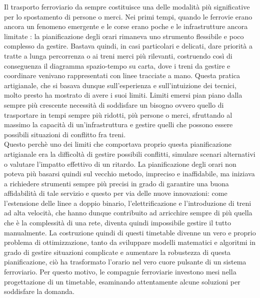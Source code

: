\documentclass[a4paper,12pt]{report}
\begin{document}
Il trasporto ferroviario da sempre costituisce una delle modalità più significative per lo spostamento di persone o merci. Nei primi tempi, quando le ferrovie erano ancora un fenomeno emergente e le corse erano poche e le infrastrutture ancora limitate : la pianificazione degli orari rimaneva uno strumento flessibile e poco complesso da gestire. Bastava quindi, in casi particolari e delicati, dare priorità a tratte a lunga percorrenza o ai treni merci più rilevanti, costruendo così di conseguenza il diagramma spazio-tempo su carta, dove i treni da gestire e coordinare venivano rappresentati con linee tracciate a mano. Questa pratica artigianale, che si basava dunque sull'esperienza e sull'intuizione dei tecnici, molto presto ha mostrato di avere i suoi limiti. Limiti emersi pian piano dalla sempre più crescente necessità di soddisfare un bisogno ovvero quello di trasportare in tempi sempre più ridotti, più persone o merci, sfruttando al massimo la capacità di un'infrastruttura e gestire quelli che possono essere possibili situazioni di conflitto fra treni. \\ Questo perchè uno dei limiti che comportava proprio questa pianificazione artigianale era la difficoltà di gestire possibili conflitti, simulare scenari alternativi o valutare l’impatto effettivo di un ritardo. 
La pianificazione degli orari non poteva più basarsi quindi sul vecchio metodo, impreciso e inaffidabile, ma iniziava a richiedere strumenti sempre più precisi in grado di garantire una buona affidabilità di tale servizio e questo per via delle nuove innovazioni: come l'estensione delle linee a doppio binario, l'elettrificazione e l'introduzione di treni ad alta velocità, che hanno dunque contribuito ad arricchire sempre di più quella che è la complessità di una rete, diventa quindi impossibile gestire il tutto manualmente. La costruzione quindi di questi timetable divenne un vero e proprio problema di ottimizzazione, tanto da sviluppare modelli matematici e algoritmi in grado di gestire situazioni complicate e aumentare la robustezza di questa pianificazione, ciò ha trasformato l'orario nel vero cuore pulsante di un sistema ferroviario.
Per questo motivo, le compagnie ferroviarie investono mesi nella progettazione di un timetable, esaminando attentamente alcune soluzioni per soddisfare la domanda.
\end{document}
